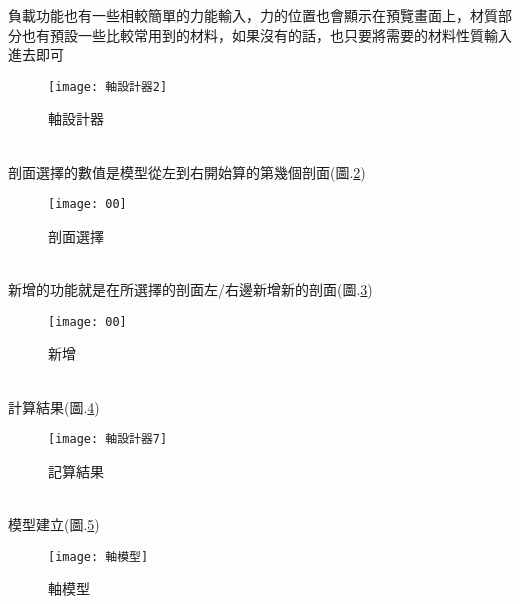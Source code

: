\begin{itemize}
		\qquad 負載功能也有一些相較簡單的力能輸入，力的位置也會顯示在預覽畫面上，材質部分也有預設一些比較常用到的材料，如果沒有的話，也只要將需要的材料性質輸入進去即可\\
		\begin{figure}[hbt!]
		\begin{center}
		\texttt{[image: 軸設計器2]}
		\caption{\Large 軸設計器}\label{軸設計器}
		\end{center}
		\end{figure}
		\\
		剖面選擇的數值是模型從左到右開始算的第幾個剖面(圖.\ref{剖面選擇})
		\begin{figure}[hbt!]
		\begin{center}
		\texttt{[image: 00]}
		\caption{\Large 剖面選擇}\label{剖面選擇}
		\end{center}
		\end{figure}
		\\
		新增的功能就是在所選擇的剖面左/右邊新增新的剖面(圖.\ref{2.8})\\
		\begin{figure}[hbt!]
		\begin{center}
		\texttt{[image: 00]}
		\caption{\Large 新增}\label{2.8}
		\end{center}
		\end{figure}
		\\
		計算結果(圖.\ref{2.9})
		\begin{figure}[hbt!]
		\begin{center}
		\texttt{[image: 軸設計器7]}
		\caption{\Large 記算結果}\label{2.9}
		\end{center}
		\end{figure}
		\\
		模型建立(圖.\ref{2.10})
		\begin{figure}[hbt!]
		\begin{center}
		\texttt{[image: 軸模型]}
		\caption{\Large 軸模型}\label{2.10}
		\end{center}
		\end{figure}
		\\
		
\newpage


\end{itemize}
